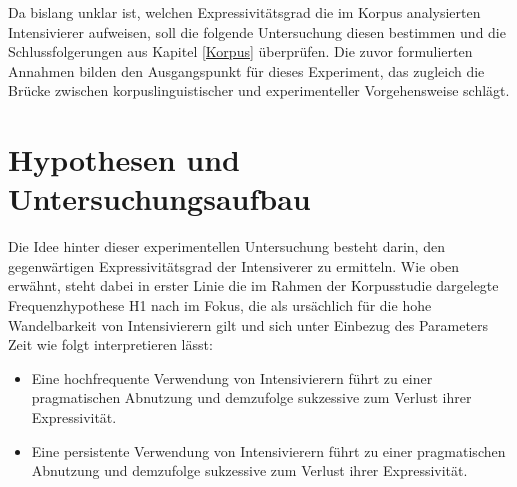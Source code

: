 Da bislang unklar ist, welchen Expressivitätsgrad die im Korpus analysierten Intensivierer aufweisen, soll die folgende Untersuchung diesen bestimmen und die Schlussfolgerungen aus Kapitel \ref{Korpus} überprüfen. Die zuvor formulierten Annahmen bilden den Ausgangspunkt für dieses Experiment, das zugleich die Brücke zwischen korpuslinguistischer und experimenteller Vorgehensweise schlägt.












\section{Hypothesen und Untersuchungsaufbau}\label{abs:Hypothese und Forschungsaufbau2}
Die Idee hinter dieser experimentellen Untersuchung besteht darin, den gegenwärtigen Expressivitätsgrad der Intensiverer zu ermitteln. Wie oben erwähnt, steht dabei in erster Linie die im Rahmen der Korpusstudie dargelegte Frequenzhypothese H1 nach {\citet[2]{Hauschild.1899}} im Fokus, die als ursächlich für die hohe Wandelbarkeit von Intensivierern gilt und sich unter Einbezug des Parameters Zeit \citep[vgl.][59]{Tobler.1868} wie folgt {interpretieren lässt}:

\begin{itemize} 
\setlength{\itemindent}{1cm}
\item[\textbf{\textsc{H1-Freq}}] Eine hochfrequente Verwendung von Intensivierern führt zu einer pragmatischen Abnutzung und demzufolge sukzessive zum Verlust ihrer Expressivität. 

\item[\textbf{\textsc{H1-Temp}}] Eine persistente Verwendung von Intensivierern führt zu einer pragmatischen Abnutzung und demzufolge sukzessive zum Verlust ihrer Expressivität. 
\end{itemize}

